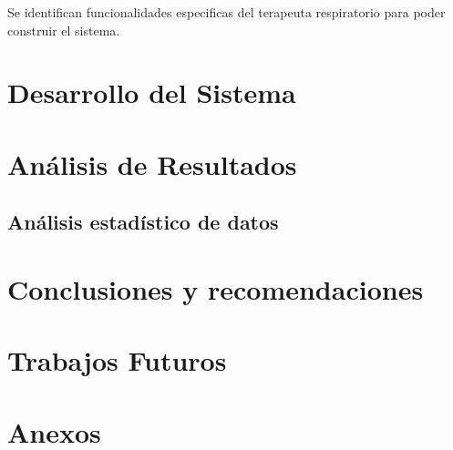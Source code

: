 \documentclass[12pt]{article}
\begin{document}
Se identifican funcionalidades especificas del terapeuta respiratorio para poder construir el sistema.




\section{Desarrollo del Sistema}

\section{Análisis de Resultados}

\subsection{Análisis estadístico de datos}





\section{Conclusiones y recomendaciones}


\section{Trabajos Futuros}




\newpage





\nocite{1}
\nocite{2}
\nocite{3}
\nocite{4}
\nocite{5}




\section{Anexos}
\end{document}
